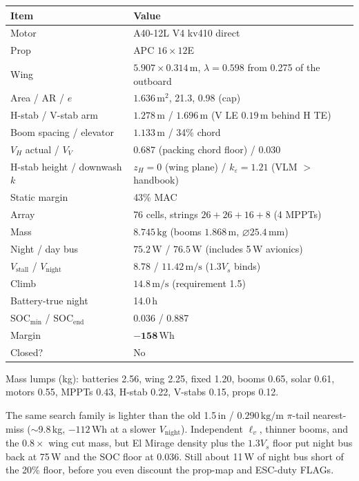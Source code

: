 \documentclass[11pt,letterpaper]{article}
\begin{document}
\begin{center}
\begin{tabular}{@{}ll@{}}
\toprule
Item & Value \\
\midrule
Motor & A40-12L V4 kv410 direct \\
Prop & APC $16\times12$E \\
Wing & $5.907\times 0.314\,\mathrm{m}$, $\lambda=0.598$ from 0.275 of the outboard \\
Area / AR / $e$ & $1.636\,\mathrm{m^2}$, 21.3, 0.98 (cap) \\
H-stab / V-stab arm & $1.278\,\mathrm{m}$ / $1.696\,\mathrm{m}$ (V LE $0.19\,\mathrm{m}$ behind H TE) \\
Boom spacing / elevator & $1.133\,\mathrm{m}$ / 34\% chord \\
$V_H$ actual / $V_V$ & $0.687$ (packing chord floor) / $0.030$ \\
H-stab height / downwash $k$ & $z_H=0$ (wing plane) / $k_\varepsilon=1.21$ (VLM $>$ handbook) \\
Static margin & 43\% MAC \\
Array & 76 cells, strings $26+26+16+8$ (4 MPPTs) \\
Mass & $8.745\,\mathrm{kg}$ (booms $1.868\,\mathrm{m}$, $\varnothing 25.4\,\mathrm{mm}$) \\
Night / day bus & $75.2\,\mathrm{W}$ / $76.5\,\mathrm{W}$ (includes 5\,W avionics) \\
$V_\mathrm{stall}$ / $V_\mathrm{night}$ & $8.78$ / $11.42\,\mathrm{m/s}$ ($1.3 V_s$ binds) \\
Climb & $14.8\,\mathrm{m/s}$ (requirement 1.5) \\
Battery-true night & 14.0\,h \\
$\mathrm{SOC}_\mathrm{min}$ / $\mathrm{SOC}_\mathrm{end}$ & 0.036 / 0.887 \\
Margin & $\mathbf{-158\,\mathrm{Wh}}$ \\
Closed? & No \\
\bottomrule
\end{tabular}
\end{center}

Mass lumps (kg): batteries 2.56, wing 2.25, fixed 1.20, booms 0.65, solar 0.61, motors 0.55, MPPTs 0.43, H-stab 0.22, V-stabs 0.15, props 0.12.

The same search family is lighter than the old 1.5\,in / $0.290\,\mathrm{kg/m}$ $\pi$-tail nearest-miss ($\sim$9.8\,kg, $-112\,\mathrm{Wh}$ at a slower $V_\mathrm{night}$). Independent $\ell_v$, thinner booms, and the $0.8\times$ wing cut mass, but El Mirage density plus the $1.3 V_s$ floor put night bus back at 75\,W and the SOC floor at 0.036. Still about 11\,W of night bus short of the 20\% floor, before you even discount the prop-map and ESC-duty FLAGs.
\end{document}
